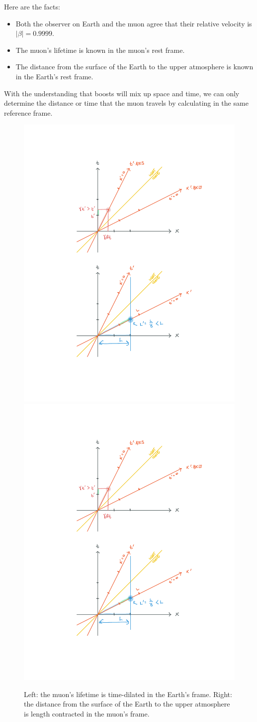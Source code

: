 \documentclass[12pt]{article}
\begin{document}

Here are the facts:
\begin{itemize}
    \item Both the observer on Earth and the muon agree that their relative velocity is $|\beta| = 0.9999$. 
    \item The muon's lifetime is known in the muon's rest frame. 
    \item The distance from the surface of the Earth to the upper atmosphere is known in the Earth's rest frame. 
\end{itemize}
With the understanding that boosts will mix up space and time, we can only determine the distance or time that the muon travels by calculating in the same reference frame. 


\begin{figure}[tb]
    \centering
    \includegraphics[width=.48\textwidth]{figures/rel_time_dil.pdf}
    \quad
    \includegraphics[width=.48\textwidth]{figures/rel_len_contractino.pdf}
    \caption{Left: the muon's lifetime is time-dilated in the Earth's frame. Right: the distance from the surface of the Earth to the upper atmosphere is length contracted in the muon's frame. }
    \label{fig:re:dilation}
\end{figure}
\end{document}
